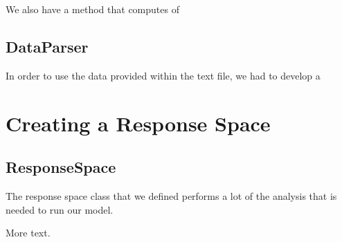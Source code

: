 \documentclass[12pt]{article} %
\begin{document}
We also have a method that computes of 



\subsection{DataParser}
In order to use the data provided within the text file, we had to develop a  





\section{Creating a Response Space}
\subsection{ResponseSpace}
The response space class that we defined performs a lot of the analysis that is needed to run our model. 


More text.
\end{document}
